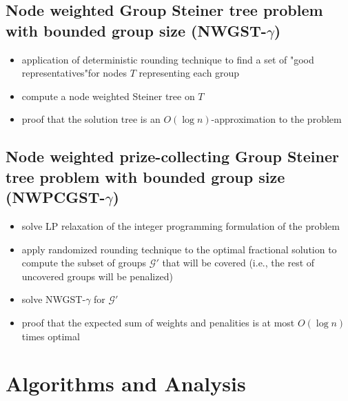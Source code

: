 \documentclass{beamer}
\begin{document}
\subsection*{Node weighted Group Steiner tree problem with bounded group size (NWGST-$\gamma$)}
\begin{frame}{\insertsection}{\insertsubsection}
    \begin{block}{}
        \begin{itemize}[<+->]
            \item application of deterministic rounding technique to find a set of "good representatives"for nodes $T$ representing each group
            \item compute a node weighted Steiner tree on $T$
            \item proof that the solution tree is an $O(\log n)$-approximation to the problem\autocite{guhaEfficientRecoveryPower1999}
        \end{itemize}
    \end{block}
\end{frame}




\subsection*{Node weighted \alert{prize-collecting} Group Steiner tree problem with bounded group size (NW\alert{PC}GST-$\gamma$)}
\begin{frame}{\insertsection}{\insertsubsection}
    \begin{block}{}
        \begin{itemize}[<+->]
            \item solve LP relaxation of the integer programming formulation of the problem
            \item apply randomized rounding technique to the optimal fractional solution to compute the subset of groups $\mathcal{G}'$ that will be covered (i.e., the rest of uncovered groups will be penalized)
            \item solve NWGST-$\gamma$ for $\mathcal{G}'$
            \item proof that the expected sum of weights and penalities is at most $O(\log n)$ times optimal
        \end{itemize}
    \end{block}
\end{frame}




\section{Algorithms and Analysis}
\end{document}
